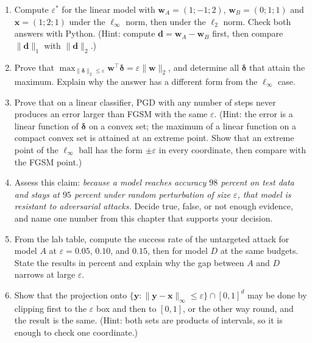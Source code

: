 \begin{latihan}
\begin{enumerate}
  \item Compute $\varepsilon^{*}$ for the linear model with
        $\mathbf{w}_A=(1;-1;2)$, $\mathbf{w}_B=(0;1;1)$ and
        $\mathbf{x}=(1;2;1)$ under the $\ell_\infty$ norm, then under the $\ell_2$ norm.
        Check both answers with Python. (Hint: compute
        $\mathbf{d}=\mathbf{w}_A-\mathbf{w}_B$ first, then compare
        $\lVert\mathbf{d}\rVert_1$ with $\lVert\mathbf{d}\rVert_2$.)

  \item Prove that $\max_{\lVert\boldsymbol{\delta}\rVert_2\le\varepsilon}
        \mathbf{w}^{\top}\boldsymbol{\delta}=\varepsilon\lVert\mathbf{w}\rVert_2$,
        and determine all $\boldsymbol{\delta}$ that attain the maximum. Explain
        why the answer has a different form from the $\ell_\infty$ case.

  \item Prove that on a linear classifier, PGD with any number of
        steps never produces an error larger than FGSM
        with the same $\varepsilon$. (Hint: the error is a linear function of
        $\boldsymbol{\delta}$ on a convex set; the maximum of a linear function on a
        compact convex set is attained at an extreme point. Show that an extreme point
        of the $\ell_\infty$ ball has the form $\pm\varepsilon$ in every coordinate,
        then compare with the FGSM point.)

  \item Assess this claim: \emph{because a model reaches accuracy $98$ percent on
        test data and stays at $95$ percent under random perturbation of size
        $\varepsilon$, that model is resistant to adversarial attacks.} Decide true,
        false, or not enough evidence, and name one number from this chapter that
        supports your decision.

  \item From the lab table, compute the success rate of the untargeted attack for
        model $A$ at $\varepsilon=0.05$, $0.10$, and $0.15$, then for
        model $D$ at the same budgets. State the results in percent and
        explain why the gap between $A$ and $D$ narrows at large $\varepsilon$.

  \item Show that the projection onto
        $\{\mathbf{y}:\lVert\mathbf{y}-\mathbf{x}\rVert_\infty\le\varepsilon\}
        \cap[0,1]^{d}$ may be done by clipping first to the $\varepsilon$ box and then
        to $[0,1]$, or the other way round, and the result is the same.
        (Hint: both sets are products of intervals, so it is enough to check
        one coordinate.)


\end{enumerate}
\end{latihan}
